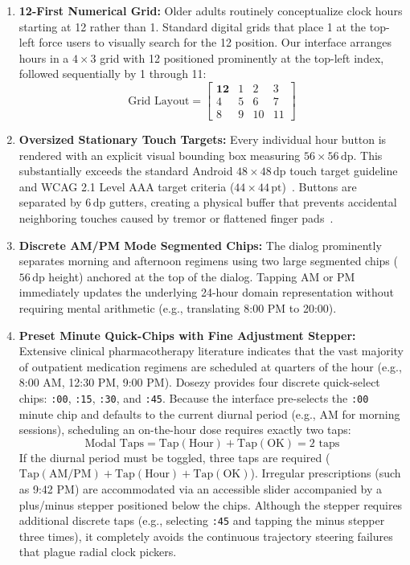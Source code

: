 \documentclass[11pt,a4paper]{article}
\begin{document}
\begin{enumerate}[leftmargin=*]
    \item \textbf{12-First Numerical Grid:} Older adults routinely conceptualize clock hours starting at 12 rather than 1. Standard digital grids that place 1 at the top-left force users to visually search for the 12 position. Our interface arranges hours in a $4 \times 3$ grid with 12 positioned prominently at the top-left index, followed sequentially by 1 through 11:
    \begin{equation}
        \text{Grid Layout} = \begin{bmatrix}
            \mathbf{12} & 1 & 2 & 3 \\
            4 & 5 & 6 & 7 \\
            8 & 9 & 10 & 11
        \end{bmatrix}
    \end{equation}
    \item \textbf{Oversized Stationary Touch Targets:} Every individual hour button is rendered with an explicit visual bounding box measuring $56 \times 56\,\text{dp}$. This substantially exceeds the standard Android $48 \times 48\,\text{dp}$ touch target guideline and WCAG 2.1 Level AAA target criteria ($44 \times 44\,\text{pt}$)~\cite{w3c2018wcag}. Buttons are separated by $6\,\text{dp}$ gutters, creating a physical buffer that prevents accidental neighboring touches caused by tremor or flattened finger pads~\cite{siek2006fat}.
    \item \textbf{Discrete AM/PM Mode Segmented Chips:} The dialog prominently separates morning and afternoon regimens using two large segmented chips ($56\,\text{dp}$ height) anchored at the top of the dialog. Tapping AM or PM immediately updates the underlying 24-hour domain representation without requiring mental arithmetic (e.g., translating 8:00 PM to 20:00).
    \item \textbf{Preset Minute Quick-Chips with Fine Adjustment Stepper:} Extensive clinical pharmacotherapy literature indicates that the vast majority of outpatient medication regimens are scheduled at quarters of the hour (e.g., 8:00 AM, 12:30 PM, 9:00 PM). Dosezy provides four discrete quick-select chips: \texttt{:00}, \texttt{:15}, \texttt{:30}, and \texttt{:45}. Because the interface pre-selects the \texttt{:00} minute chip and defaults to the current diurnal period (e.g., AM for morning sessions), scheduling an on-the-hour dose requires exactly two taps:
    \begin{equation}
        \text{Modal Taps} = \text{Tap}(\text{Hour}) + \text{Tap}(\text{OK}) = 2\text{ taps}
    \end{equation}
    If the diurnal period must be toggled, three taps are required ($\text{Tap}(\text{AM/PM}) + \text{Tap}(\text{Hour}) + \text{Tap}(\text{OK})$). Irregular prescriptions (such as 9:42 PM) are accommodated via an accessible slider accompanied by a plus/minus stepper positioned below the chips. Although the stepper requires additional discrete taps (e.g., selecting \texttt{:45} and tapping the minus stepper three times), it completely avoids the continuous trajectory steering failures that plague radial clock pickers.
\end{enumerate}
\end{document}
